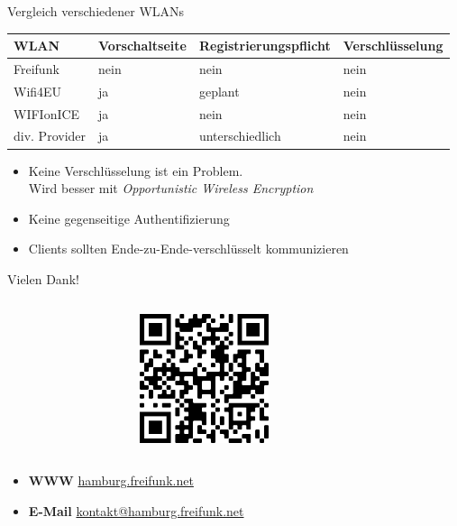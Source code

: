 \documentclass[t,aspectratio=169]{beamer}
\begin{document}
\begin{frame}{Vergleich verschiedener WLANs}
\begin{center}
\begin{tabular}{l|l|l|l}
WLAN & Vorschaltseite & Registrierungspflicht & Verschlüsselung\\\hline
Freifunk & nein & nein & nein\\
Wifi4EU & ja & geplant & nein\\
WIFIonICE & ja & nein & nein\\
div. Provider & ja & unterschiedlich & nein
\end{tabular}
\end{center}
\begin{itemize}
 \item Keine Verschlüsselung ist ein Problem.\\Wird besser mit \textit{Opportunistic Wireless Encryption}
 \item Keine gegenseitige Authentifizierung
 \item Clients sollten Ende-zu-Ende-verschlüsselt kommunizieren
\end{itemize}


\end{frame}
	
  
  \begin{frame}{Vielen Dank!}
    \begin{columns}
      \begin{column}{0.5\textwidth}
        \centering
        
      \end{column}
      \begin{column}{0.5\textwidth}
        \centering
        \includegraphics[width=0.4\textwidth]{Bilder/qrcode-2020-11-12}
      \end{column}
    \end{columns}   
    \vspace{4em}
    \begin{itemize}
      \item \textbf{WWW} \href{https://hamburg.freifunk.net}{hamburg.freifunk.net}
      \item \textbf{E-Mail} \href{mailto:kontakt@hamburg.freifunk.net}{kontakt@hamburg.freifunk.net}
    \end{itemize}
  \end{frame}
  
\end{document}
